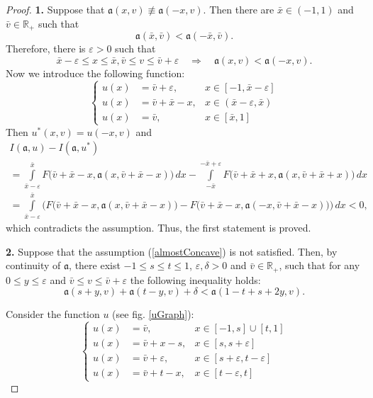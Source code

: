 \documentclass[12pt]{article}
\newcommand{\Real}{\mathbb R}
\newcommand{\eps}{\varepsilon}
\renewcommand{\le}{\leqslant}
\begin{document}
\begin{proof}
{\bf 1.} Suppose that $\mathfrak a(x, v) \not \equiv \mathfrak a(-x, v)$.
Then there are $\bar{x} \in (-1, 1 )$ and $\bar{v} \in \Real_+$ such that
$$\mathfrak a(\bar{x}, \bar{v}) < \mathfrak a(-\bar{x}, \bar{v}).$$
Therefore, there is $\eps> 0$ such that
$$\bar{x} - \eps \le x \le \bar{x}, \bar{v} \le v \le \bar{v} + \eps \quad \Longrightarrow \quad \mathfrak a(x, v) < \mathfrak a(-x, v).$$
Now we introduce the following function:
$$
\left\{     
\begin{aligned}
u(x) &= \bar{v} + \eps, & x \in [-1,\bar{x}-\eps]\\
u(x) &= \bar{v} + \bar{x} - x, & x \in (\bar{x} - \eps, \bar{x})\\
u(x) &= \bar{v}, & x \in [\bar{x}, 1]
\end{aligned}
\right.
$$
Then $u^*(x, v) = u(-x, v)$ and
\begin{multline*}
I(\mathfrak a, u)-I(\mathfrak a, u^*) \\
= \int\limits_{\bar{x}-\eps}^{\bar{x}} F\big( \bar{v} + \bar{x} - x, \mathfrak a(x, \bar{v} + \bar{x} - x) \big) \, dx -
\int\limits_{-\bar{x}}^{-\bar{x}+\eps} F\big( \bar{v} + \bar{x} + x, \mathfrak a(x, \bar{v} + \bar{x} + x) \big) \, dx \\
= \int\limits_{\bar{x}-\eps}^{\bar{x}} \big( F\big( \bar{v} + \bar{x} - x, \mathfrak a(x, \bar{v} + \bar{x} - x) \big) -
F\big( \bar{v} + \bar{x} - x, \mathfrak a(-x, \bar{v} + \bar{x} - x) \big) \big) \, dx < 0,
\end{multline*}
which contradicts the assumption. Thus, the first statement is proved.

{\bf 2.} Suppose that the assumption (\ref{almostConcave}) is not satisfied.
Then, by continuity of $\mathfrak a$, there exist $-1 \le s \le t \le 1$, $\eps, \delta> 0$ and $\bar{v} \in \Real_+$, such that
for any $0 \le y \le \eps$ and $\bar{v} \le v \le \bar{v} + \eps$ the following inequality holds:
$$\mathfrak a(s + y, v) + \mathfrak a(t - y, v) + \delta < \mathfrak a( 1 - t + s + 2y, v).$$

Consider the function $u$ (see fig. \ref{uGraph}):
\begin{equation}
\label{parLinU}
\left\{     
\begin{aligned}
u(x) &= \bar{v}, & x \in [-1, s] \cup [t, 1]\\
u(x) &= \bar{v} + x - s, & x \in [s, s + \eps]\\
u(x) &= \bar{v} + \eps, & x \in [s + \eps, t - \eps]\\
u(x) &= \bar{v} + t - x, & x \in [t - \eps, t]
\end{aligned}
\right.
\end{equation}


\end{proof}
\end{document}
